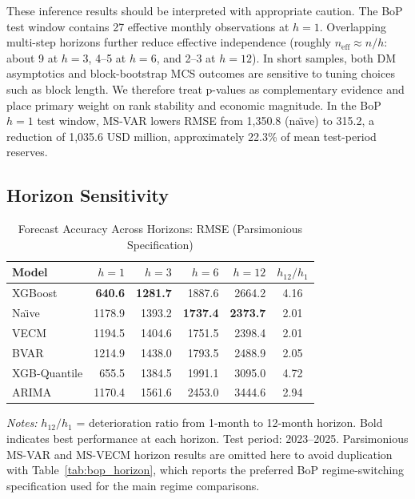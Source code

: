 \documentclass[12pt,a4paper]{article}
\begin{document}
These inference results should be interpreted with appropriate caution. The BoP test window contains 27 effective monthly observations at $h=1$. Overlapping multi-step horizons further reduce effective independence (roughly $n_{\text{eff}} \approx n/h$: about 9 at $h=3$, 4--5 at $h=6$, and 2--3 at $h=12$). In short samples, both DM asymptotics and block-bootstrap MCS outcomes are sensitive to tuning choices such as block length. We therefore treat p-values as complementary evidence and place primary weight on rank stability and economic magnitude. In the BoP $h=1$ test window, MS-VAR lowers RMSE from 1,350.8 (na\"{\i}ve) to 315.2, a reduction of 1,035.6 USD million, approximately 22.3\% of mean test-period reserves.

\subsection{Horizon Sensitivity}

\begin{table}[htbp]
\centering
\caption{Forecast Accuracy Across Horizons: RMSE (Parsimonious Specification)}
\label{tab:horizon}
\begin{tabular}{lrrrrc}
\toprule
Model & $h = 1$ & $h = 3$ & $h = 6$ & $h = 12$ & $h_{12}/h_1$ \\
\midrule
XGBoost & \textbf{640.6} & \textbf{1281.7} & 1887.6 & 2664.2 & 4.16 \\
Na\"{\i}ve & 1178.9 & 1393.2 & \textbf{1737.4} & \textbf{2373.7} & 2.01 \\
VECM & 1194.5 & 1404.6 & 1751.5 & 2398.4 & 2.01 \\
BVAR & 1214.9 & 1438.0 & 1793.5 & 2488.9 & 2.05 \\
XGB-Quantile & 655.5 & 1384.5 & 1991.1 & 3095.0 & 4.72 \\
ARIMA & 1170.4 & 1561.6 & 2453.0 & 3444.6 & 2.94 \\
\bottomrule
\end{tabular}
\begin{tablenotes}
\small
\item \textit{Notes:} $h_{12}/h_1$ = deterioration ratio from 1-month to 12-month horizon. Bold indicates best performance at each horizon. Test period: 2023--2025. Parsimonious MS-VAR and MS-VECM horizon results are omitted here to avoid duplication with Table~\ref{tab:bop_horizon}, which reports the preferred BoP regime-switching specification used for the main regime comparisons.
\end{tablenotes}
\end{table}
\end{document}
